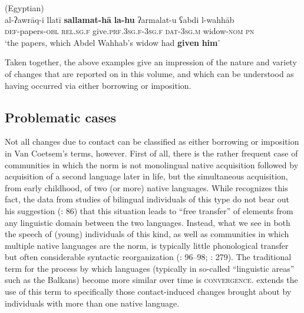 \documentclass[output=paper]{langsci/langscibook}
\begin{document}
\ea
\label{introwilmsen1} ({Egyptian})\\
\gll al-ʔawrāq-i llatī \textbf{sallamat-hā} \textbf{la-hu} ʔarmalat-u ʕabdi l-wahhāb\\
     \textsc{def}{}-papers-\textsc{obl} \textsc{rel.sg.f} give.\textsc{prf.3sg.f-3sg.f} \textsc{dat-3sg.m} widow-\textsc{nom} \textsc{pn}\\
     \glt ‘the papers, which Abdel Wahhab’s widow had \textbf{given} \textbf{him}’
\z


Taken together, the above examples give an impression of the nature and variety of changes that are reported on in this volume, and which can be understood as having occurred via either borrowing or {imposition}.

\subsection{Problematic cases}\label{introproblem}

Not all changes due to contact can be classified as either borrowing or {imposition} in Van Coetsem's terms, however. First of all, there is the rather frequent case of communities in which the norm is not {monolingual} native acquisition followed by acquisition of a second language later in life, but the simultaneous acquisition, from early childhood, of two (or more) native languages. While \citet{VanCoetsem2000} recognizes this fact, the data from studies of bilingual individuals of this type do not bear out his suggestion (\citeyear{VanCoetsem2000}: 86) that this situation leads to ``free {transfer}'' of elements from any linguistic domain between the two languages. Instead, what we see in both the speech of (young) individuals of this kind, as well as communities in which multiple native languages are the norm, is typically little phonological {transfer} but often considerable syntactic reorganization (\citealt{Lucas2009}: 96--98; \citeyear{Lucas2012}: 279). The traditional term for the process by which languages (typically in so-called ``linguistic areas'' such as the Balkans) become more similar over time is \textsc{convergence}. \citet{Lucas2015} extends the use of this term to specifically those contact-induced changes brought about by individuals with more than one native language.
\end{document}
